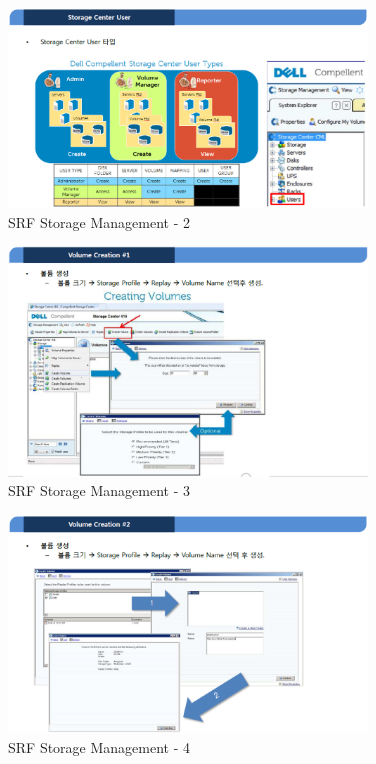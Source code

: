 \documentclass[11pt
  , a4paper
  , article
  , oneside
]{memoir}
\begin{document}
\begin{figure}[h!]
	\centering
	\includegraphics[width=0.85\textwidth]{./images/srfdb_storage_mana_2.eps}
	\caption{SRF Storage Management - 2}
	\label{fig:srfdb_mana_2} 
\end{figure}

\begin{figure}[h!]
	\centering
	\includegraphics[width=0.85\textwidth]{./images/srfdb_storage_mana_3.eps}
	\caption{SRF Storage Management - 3}
	\label{fig:srfdb_mana_3} 
\end{figure}

\begin{figure}[h!]
	\centering
	\includegraphics[width=0.85\textwidth]{./images/srfdb_storage_mana_4.eps}
	\caption{SRF Storage Management - 4}
	\label{fig:srfdb_mana_4} 
\end{figure}
\end{document}
